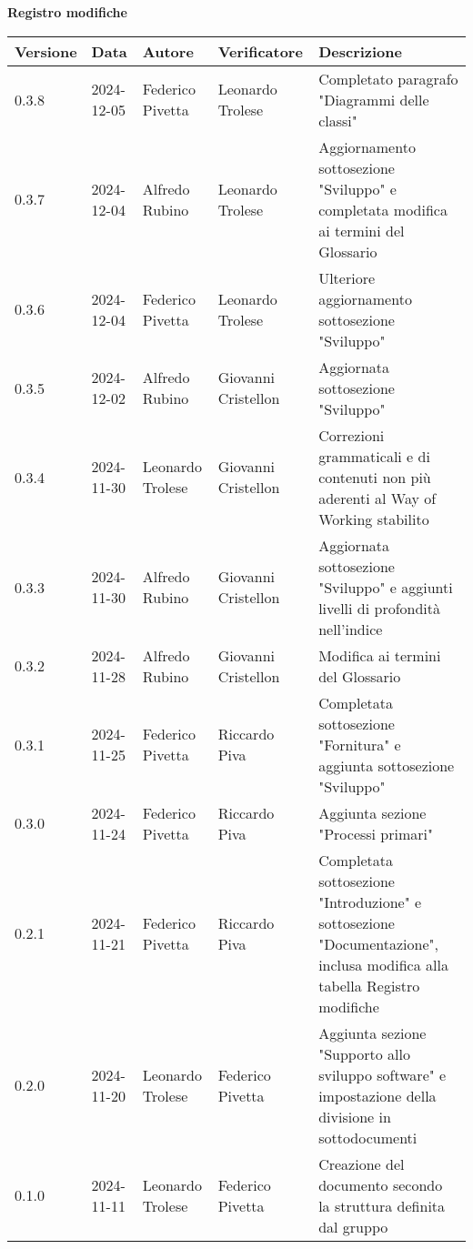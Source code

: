 
\begin{center}
\textbf{Registro modifiche}\\
\vspace{2mm}

\begin{tabularx}{\textwidth}{|l|l|l|l|X|}
\hline
\textbf{Versione} & \textbf{Data} & \textbf{Autore} & \textbf{Verificatore} & \textbf{Descrizione}\\
    \hline
    0.3.8 & 2024-12-05  & Federico Pivetta & Leonardo Trolese & Completato paragrafo "Diagrammi delle classi"\\
    \hline
    0.3.7 & 2024-12-04  & Alfredo Rubino & Leonardo Trolese & Aggiornamento sottosezione "Sviluppo" e completata modifica ai termini del Glossario\\
    \hline
    0.3.6 & 2024-12-04  & Federico Pivetta & Leonardo Trolese & Ulteriore aggiornamento sottosezione "Sviluppo"\\
    \hline
    0.3.5 & 2024-12-02  & Alfredo Rubino & Giovanni Cristellon & Aggiornata sottosezione "Sviluppo"\\
    \hline
    0.3.4 & 2024-11-30  & Leonardo Trolese & Giovanni Cristellon & Correzioni grammaticali e di contenuti non più aderenti al Way of Working stabilito\\
    \hline
    0.3.3 & 2024-11-30  & Alfredo Rubino & Giovanni Cristellon & Aggiornata sottosezione "Sviluppo" e aggiunti livelli di profondità nell'indice\\
    \hline
    0.3.2 & 2024-11-28  & Alfredo Rubino & Giovanni Cristellon & Modifica ai termini del Glossario\\
    \hline
    0.3.1 & 2024-11-25  & Federico Pivetta & Riccardo Piva & Completata sottosezione "Fornitura" e aggiunta sottosezione "Sviluppo"\\
    \hline
    0.3.0 & 2024-11-24  & Federico Pivetta & Riccardo Piva & Aggiunta sezione "Processi primari"\\
    \hline
     0.2.1 & 2024-11-21  & Federico Pivetta  & Riccardo Piva & Completata sottosezione "Introduzione" e sottosezione "Documentazione", inclusa modifica alla tabella Registro modifiche\\
    \hline
    0.2.0 & 2024-11-20  & Leonardo Trolese & Federico Pivetta & Aggiunta sezione "Supporto allo sviluppo software" e impostazione della divisione in sottodocumenti\\
    \hline
    0.1.0 & 2024-11-11  & Leonardo Trolese & Federico Pivetta & Creazione del documento secondo la struttura definita dal gruppo\\
    \hline
\end{tabularx}
\end{center}